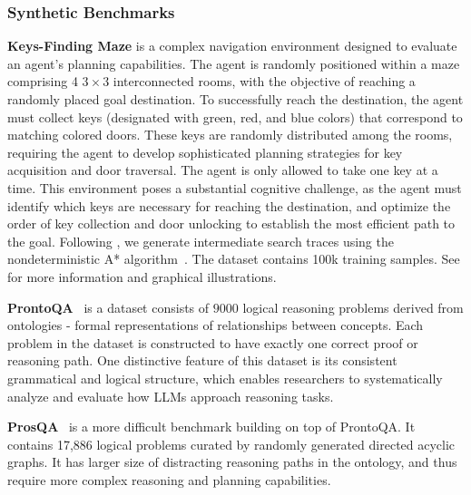 \subsubsection{Synthetic Benchmarks}

\textbf{Keys-Finding Maze} is a complex navigation environment designed to evaluate an agent's planning capabilities. The agent is randomly positioned within a maze comprising 4 $3 \times 3$ interconnected rooms, with the objective of reaching a randomly placed goal destination. To successfully reach the destination, the agent must collect keys (designated with green, red, and blue colors) that correspond to matching colored doors. These keys are randomly distributed among the rooms, requiring the agent to develop sophisticated planning strategies for key acquisition and door traversal. The agent is only allowed to take one key at a time. This environment poses a substantial cognitive challenge, as the agent must identify which keys are necessary for reaching the destination, and optimize the order of key collection and door unlocking to establish the most efficient path to the goal. Following \citet{lehnert2024beyond,su2024dualformer}, we generate intermediate search traces using the nondeterministic A* algorithm~\cite{hart1968formal}. The dataset contains 100k training samples. See  for more information and graphical illustrations.

\textbf{ProntoQA}~\cite{saparov2022language} is a dataset consists of $9000$ logical reasoning problems derived from ontologies - formal representations of relationships between concepts. Each problem in the dataset is constructed to have exactly one correct proof or reasoning path. One distinctive feature of this dataset is its consistent grammatical and logical structure, which enables researchers to systematically analyze and evaluate how LLMs approach reasoning tasks. 

\textbf{ProsQA}~\cite{hao2024training} is a more difficult benchmark building on top of ProntoQA. It contains 17,886 logical problems curated by randomly generated directed acyclic graphs. %
It has larger size of distracting reasoning paths in the ontology, and thus require more complex reasoning and planning capabilities.

